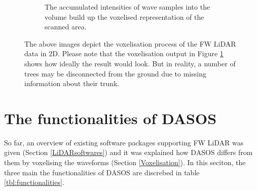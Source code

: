 \documentclass{subfiles}
\begin{document}
\begin{figure} [h!]
\begin{subfigure}[t]{.31\textwidth}
				\caption{The accumulated intensities of wave samples into the volume build up the voxelised representation of the scanned area.} 
				\label{fig:VoxelisationC_voxelised}
			\end{subfigure}
			\caption[Voxelisation of FW LiDAR data]{The above images depict the voxelisation process of the FW LiDAR data in 2D. Please note that the voxelisation output in Figure \ref{fig:VoxelisationC_voxelised} shows how ideally the result would look. But in reality, a number of trees may be disconnected from the ground due to missing information about their trunk.}
			\label{fig:Voxelisation}
		\end{figure}
		
	
		
		
	\section{The functionalities of DASOS}\label{DASOS}
	
		\par So far, an overview of existing software packages supporting FW LiDAR was given (Section \ref{LiDARsoftwares}) and it was explained how DASOS differs from them by voxelising the waveforms (Section \ref{Voxelisation}). In this seciton, the three main the functionalities of DASOS are discrebed in table \ref{tbl:functionalities}.
		\newpage
     
\end{document}
